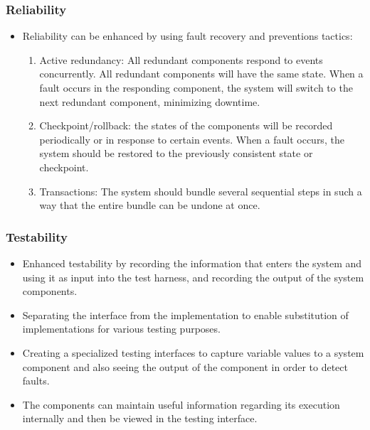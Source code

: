 \subsubsection{Reliability}
	\begin{itemize}
		\item Reliability can be enhanced by using fault recovery and preventions tactics:
		\begin{enumerate}
			\item Active redundancy: All redundant components respond to events concurrently. All redundant components will have the same state. When a fault occurs in the responding component, the system will switch to the next redundant component, minimizing downtime.
			\item Checkpoint/rollback: the states of the components will be recorded periodically or in response to certain events. When a fault occurs, the system should be restored to the previously consistent state or checkpoint.
			\item Transactions: The system should bundle several sequential steps in such a way that the entire bundle can be undone at once. 
		\end{enumerate}
	\end{itemize}
\subsubsection{Testability}
	\begin{itemize}
		\item Enhanced testability by recording the information that enters the system and using it as input into the test harness, and recording the output of the system components.
		\item Separating the interface from the implementation to enable substitution of implementations for various testing purposes.
		\item Creating a specialized testing interfaces to capture variable values to a system component and also seeing the output of the component in order to detect faults.
		\item The components can maintain useful information regarding its execution internally and then be viewed in the testing interface.
	\end{itemize}